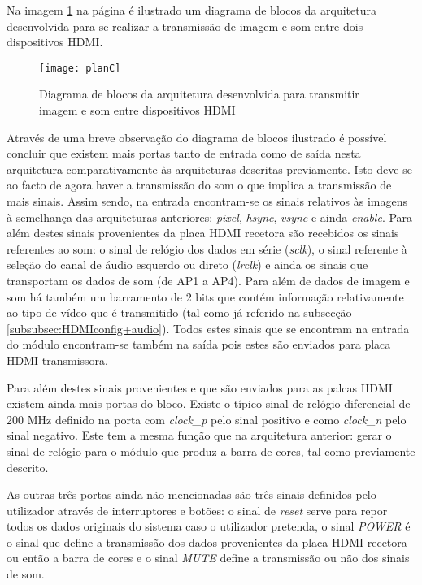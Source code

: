 Na imagem \ref{fig:planC} na página \pageref{fig:planC} é ilustrado um diagrama de blocos da arquitetura desenvolvida para se realizar a transmissão de imagem e som entre dois dispositivos HDMI. 

\begin{figure}[h!]
	\begin{center}
		\leavevmode
		\texttt{[image: planC]}
		\caption{Diagrama de blocos da arquitetura desenvolvida para transmitir imagem e som entre dispositivos HDMI}
		\label{fig:planC}
	\end{center}
\end{figure}

Através de uma breve observação do diagrama de blocos ilustrado é possível concluir que existem mais portas tanto de entrada como de saída nesta arquitetura comparativamente às arquiteturas descritas previamente. Isto deve-se ao facto de agora haver a transmissão do som o que implica a transmissão de mais sinais. Assim sendo, na entrada encontram-se os sinais relativos às imagens à semelhança das arquiteturas anteriores: \textit{pixel}, \textit{hsync}, \textit{vsync} e ainda \textit{enable}. Para além destes sinais provenientes da placa HDMI recetora são recebidos os sinais referentes ao som: o sinal de relógio dos dados em série (\textit{sclk}), o sinal referente à seleção do canal de áudio esquerdo ou direto (\textit{lrclk}) e ainda os sinais que transportam os dados de som (de AP1 a AP4). Para além de dados de imagem e som há também um barramento de 2 bits que contém informação relativamente ao tipo de vídeo que é transmitido (tal como já referido na subsecção \ref{subsubsec:HDMIconfig+audio}). Todos estes sinais que se encontram na entrada do módulo encontram-se também na saída pois estes são enviados para placa HDMI transmissora.

Para além destes sinais provenientes e que são enviados para as palcas HDMI existem ainda mais portas do bloco. Existe o típico sinal de relógio diferencial de 200 MHz definido na porta com \textit{clock\_p} pelo sinal positivo e como \textit{clock\_n} pelo sinal negativo. Este tem a mesma função que na arquitetura anterior: gerar o sinal de relógio para o módulo que produz a barra de cores, tal como previamente descrito. 

As outras três portas ainda não mencionadas são três sinais definidos pelo utilizador através de interruptores e botões: o sinal de \textit{reset} serve para repor todos os dados originais do sistema caso o utilizador pretenda, o sinal \textit{POWER} é o sinal que define a transmissão dos dados provenientes da placa HDMI recetora ou então a barra de cores e o sinal \textit{MUTE} define a transmissão ou não dos sinais de som.

